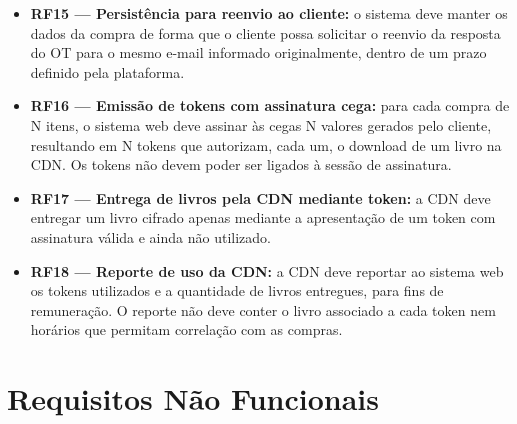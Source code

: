 \documentclass[12pt, oneside, a4paper, english, brazil]{abntex2}
\begin{document}
\begin{itemize}
\item \textbf{RF15 --- Persistência para reenvio ao cliente:} o sistema deve
manter os dados da compra de forma que o cliente possa solicitar o reenvio da
resposta do OT para o mesmo e-mail informado originalmente, dentro de um prazo
definido pela plataforma.

\item \textbf{RF16 --- Emissão de tokens com assinatura cega:} para cada
compra de N itens, o sistema web deve assinar às cegas N valores gerados pelo
cliente, resultando em N tokens que autorizam, cada um, o download de um livro
na CDN. Os tokens não devem poder ser ligados à sessão de assinatura.

\item \textbf{RF17 --- Entrega de livros pela CDN mediante token:} a CDN deve
entregar um livro cifrado apenas mediante a apresentação de um token com
assinatura válida e ainda não utilizado.

\item \textbf{RF18 --- Reporte de uso da CDN:} a CDN deve reportar ao sistema
web os tokens utilizados e a quantidade de livros entregues, para fins de
remuneração. O reporte não deve conter o livro associado a cada token nem
horários que permitam correlação com as compras.
\end{itemize}

\section{Requisitos Não Funcionais}
\end{document}
